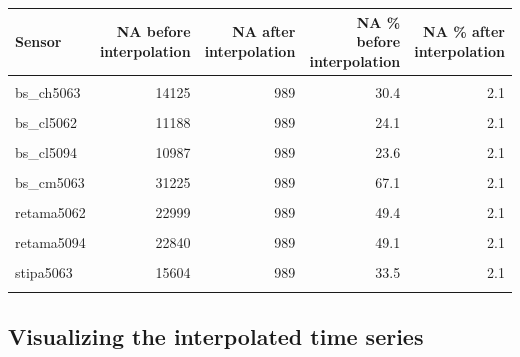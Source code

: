 \documentclass[]{article}
\begin{document}
\begin{table}[H]
\centering
\begin{tabular}[t]{l|r|r|r|r}
\hline
Sensor & NA before interpolation & NA after interpolation & NA \% before interpolation & NA \% after interpolation\\
\hline
\cellcolor{gray!6}{bs\_ch5062} & \cellcolor{gray!6}{11776} & \cellcolor{gray!6}{989} & \cellcolor{gray!6}{25.3} & \cellcolor{gray!6}{2.1}\\
\hline
bs\_ch5063 & 14125 & 989 & 30.4 & 2.1\\
\hline
\cellcolor{gray!6}{bs\_ch5094} & \cellcolor{gray!6}{7674} & \cellcolor{gray!6}{989} & \cellcolor{gray!6}{16.5} & \cellcolor{gray!6}{2.1}\\
\hline
bs\_cl5062 & 11188 & 989 & 24.1 & 2.1\\
\hline
\cellcolor{gray!6}{bs\_cl5063} & \cellcolor{gray!6}{11114} & \cellcolor{gray!6}{989} & \cellcolor{gray!6}{23.9} & \cellcolor{gray!6}{2.1}\\
\hline
bs\_cl5094 & 10987 & 989 & 23.6 & 2.1\\
\hline
\cellcolor{gray!6}{bs\_cm5062} & \cellcolor{gray!6}{18743} & \cellcolor{gray!6}{989} & \cellcolor{gray!6}{40.3} & \cellcolor{gray!6}{2.1}\\
\hline
bs\_cm5063 & 31225 & 989 & 67.1 & 2.1\\
\hline
\cellcolor{gray!6}{bs\_cm5094} & \cellcolor{gray!6}{16934} & \cellcolor{gray!6}{989} & \cellcolor{gray!6}{36.4} & \cellcolor{gray!6}{2.1}\\
\hline
retama5062 & 22999 & 989 & 49.4 & 2.1\\
\hline
\cellcolor{gray!6}{retama5063} & \cellcolor{gray!6}{20505} & \cellcolor{gray!6}{989} & \cellcolor{gray!6}{44.1} & \cellcolor{gray!6}{2.1}\\
\hline
retama5094 & 22840 & 989 & 49.1 & 2.1\\
\hline
\cellcolor{gray!6}{stipa5062} & \cellcolor{gray!6}{15363} & \cellcolor{gray!6}{989} & \cellcolor{gray!6}{33.0} & \cellcolor{gray!6}{2.1}\\
\hline
stipa5063 & 15604 & 989 & 33.5 & 2.1\\
\hline
\cellcolor{gray!6}{stipa5094} & \cellcolor{gray!6}{10553} & \cellcolor{gray!6}{989} & \cellcolor{gray!6}{22.7} & \cellcolor{gray!6}{2.1}\\
\hline
\end{tabular}
\end{table}

\hypertarget{visualizing-the-interpolated-time-series}{%
\subsection{Visualizing the interpolated time
series}\label{visualizing-the-interpolated-time-series}}
\end{document}
